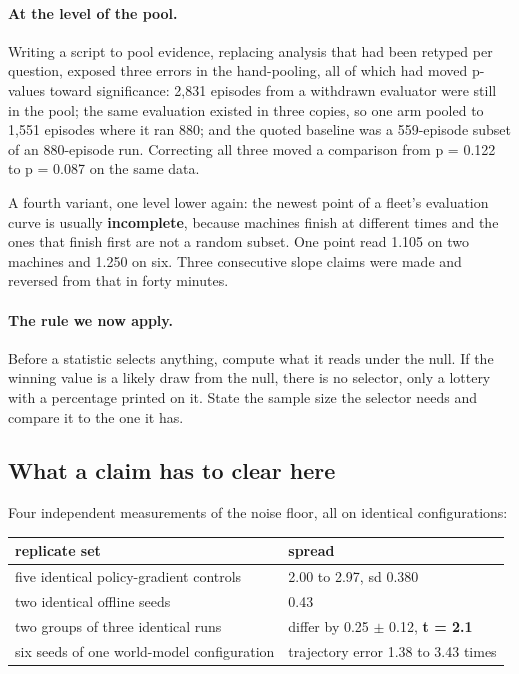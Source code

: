 \documentclass[11pt]{article}
\begin{document}
\paragraph{At the level of the pool.} Writing a script to pool evidence, replacing analysis that had been retyped per question, exposed three errors in the hand-pooling, all of which had moved p-values toward significance: 2,831 episodes from a withdrawn evaluator were still in the pool; the same evaluation existed in three copies, so one arm pooled to 1,551 episodes where it ran 880; and the quoted baseline was a 559-episode subset of an 880-episode run. Correcting all three moved a comparison from p = 0.122 to p = 0.087 on the same data.

A fourth variant, one level lower again: the newest point of a fleet's evaluation curve is usually \textbf{incomplete}, because machines finish at different times and the ones that finish first are not a random subset. One point read 1.105 on two machines and 1.250 on six. Three consecutive slope claims were made and reversed from that in forty minutes.

\paragraph{The rule we now apply.} Before a statistic selects anything, compute what it reads under the null. If the winning value is a likely draw from the null, there is no selector, only a lottery with a percentage printed on it. State the sample size the selector needs and compare it to the one it has.

\subsection{What a claim has to clear here}
\label{sec:9.4}

Four independent measurements of the noise floor, all on identical configurations:

\begin{table}[!htbp]
  \centering
  \label{tab:thenoisefloormeasuredfourind}
\begin{center}\small
\begin{tabularx}{\linewidth}{@{}XX@{}}
\toprule
\textbf{replicate set} & \textbf{spread} \\
\midrule
five identical policy-gradient controls & 2.00 to 2.97, sd 0.380 \\
two identical offline seeds & 0.43 \\
two groups of three identical runs & differ by 0.25 $\pm$ 0.12, \textbf{t = 2.1} \\
six seeds of one world-model configuration & trajectory error 1.38 to 3.43 times \\
\bottomrule
\end{tabularx}
\end{center}
\end{table}
\end{document}
